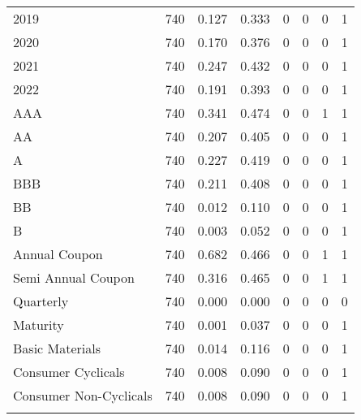 \begin{table}[!htbp]
\begin{tabular}{@{\extracolsep{5pt}}lccccccc}
2019 & 740 & 0.127 & 0.333 & 0 & 0 & 0 & 1 \\ 
2020 & 740 & 0.170 & 0.376 & 0 & 0 & 0 & 1 \\ 
2021 & 740 & 0.247 & 0.432 & 0 & 0 & 0 & 1 \\ 
2022 & 740 & 0.191 & 0.393 & 0 & 0 & 0 & 1 \\ 
AAA & 740 & 0.341 & 0.474 & 0 & 0 & 1 & 1 \\ 
AA & 740 & 0.207 & 0.405 & 0 & 0 & 0 & 1 \\ 
A & 740 & 0.227 & 0.419 & 0 & 0 & 0 & 1 \\ 
BBB & 740 & 0.211 & 0.408 & 0 & 0 & 0 & 1 \\ 
BB & 740 & 0.012 & 0.110 & 0 & 0 & 0 & 1 \\ 
B & 740 & 0.003 & 0.052 & 0 & 0 & 0 & 1 \\ 
Annual Coupon & 740 & 0.682 & 0.466 & 0 & 0 & 1 & 1 \\ 
Semi Annual Coupon & 740 & 0.316 & 0.465 & 0 & 0 & 1 & 1 \\ 
Quarterly & 740 & 0.000 & 0.000 & 0 & 0 & 0 & 0 \\ 
Maturity & 740 & 0.001 & 0.037 & 0 & 0 & 0 & 1 \\ 
Basic Materials & 740 & 0.014 & 0.116 & 0 & 0 & 0 & 1 \\ 
Consumer Cyclicals & 740 & 0.008 & 0.090 & 0 & 0 & 0 & 1 \\ 
Consumer Non-Cyclicals & 740 & 0.008 & 0.090 & 0 & 0 & 0 & 1 \\ 
\hline \\[-1.8ex] 
\end{tabular} 
\end{table}

